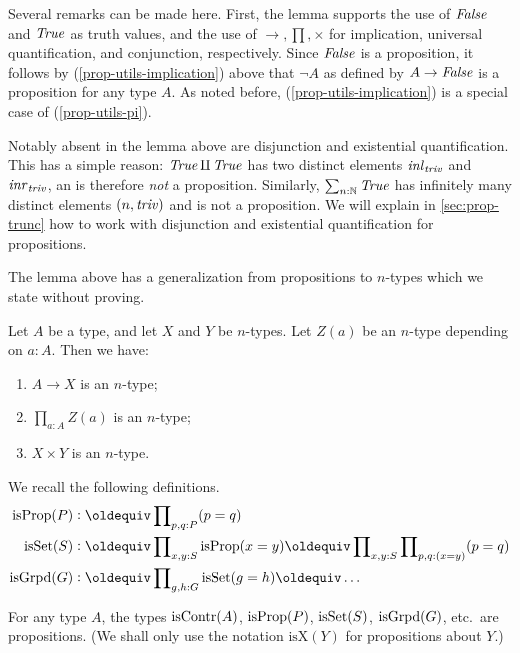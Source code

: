 Several remarks can be made here. First, the lemma supports the
use of $\mathop{\mathit{False}}$ and $\mathop{\mathit{True}}$ as truth values, and the use of
$\to,\prod,\times$ for implication, universal quantification,
and conjunction, respectively. Since $\mathop{\mathit{False}}$ is a proposition,
it follows by (\ref{prop-utils-implication}) above that
$\neg A$ as defined by $A\to\mathop{\mathit{False}}$ is a proposition for any type $A$.
As noted before, (\ref{prop-utils-implication}) is a
special case of (\ref{prop-utils-pi}).

Notably absent in the lemma above are disjunction
and existential quantification. This has a simple reason:
$\mathop{\mathit{True}}\amalg \mathop{\mathit{True}}$ has two distinct elements
$\mathop{{\it inl}_{\mathop{\mathit{triv}}}}$ and $\mathop{{\it inr}_{\mathop{\mathit{triv}}}}$, an is therefore \emph{not} a proposition.
Similarly, $\sum_{n:\mathbb{N}} \mathop{\mathit{True}}$ has infinitely many
distinct elements $(n,\mathop{\mathit{triv}})$ and is not a proposition. We will explain 
in \cref{sec:prop-trunc} how to work with disjunction and 
existential quantification for propositions.

The lemma above has a generalization from propositions to
$n$-types which we state without proving.

\begin{lemma}\label{lem:level-n-utils}
Let $A$ be a type, and let $X$ and $Y$ be $n$-types.
Let $Z(a)$ be an $n$-type depending on $a:A$. Then we have:

\begin{enumerate}
\item\label{level-n-utils-implication} $A\to X$ is an $n$-type;
\item\label{level-n-utils-pi} $\prod_{a:A} Z(a)$ is an $n$-type;
\item\label{level-n-utils-times} $X\times Y$ is an $n$-type.
\end{enumerate}
\end{lemma}

We recall the following definitions.
\begin{align*}
\isprop(P) &\defeq\prod\nolimits_{p,q:P}(p=q)\\
\isset(S) &\defeq\prod\nolimits_{x,y:S}\isprop(x=y)\jdeq
                  \prod\nolimits_{x,y:S}\prod\nolimits_{p,q:(x=y)}(p=q)\\
\isgrpd(G) &\defeq\prod\nolimits_{g,h:G}\isset(g=h)\jdeq \ldots\\
\end{align*}

\begin{lemma}\label{lem:isX-is-prop}
  For any type $A$, the types 
$\mathrm{isContr}(A)$, $\mathrm{isProp}(P)$, $\mathrm{isSet}(S)$, $\mathrm{isGrpd}(G)$, etc.\ are propositions.
(We shall only use the notation $\mathrm{isX}(Y)$ for propositions about $Y$.)
\end{lemma}


